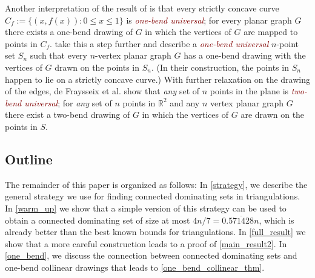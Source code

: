 \documentclass{article}
\newcommand{\R}{\mathbb{R}}
\newcommand{\defin}[1]{\emph{\textcolor{Maroon}{#1}}}
\theoremstyle{definition}
\begin{document}
Another interpretation of the result of \citet{DBLP:journals/comgeo/GiacomoDLW05} is that every strictly concave curve $C_f:=\{(x,f(x)):0\le x\le 1\}$ is \defin{one-bend universal}; for every planar graph $G$ there exists a one-bend drawing of $G$ in which the vertices of $G$ are mapped to points in $C_f$. \citet{DBLP:conf/gd/EverettLLW07} take this a step further and describe a \defin{one-bend universal} $n$-point set $S_n$ such that every $n$-vertex planar graph $G$ has a one-bend drawing with the vertices of $G$ drawn on the points in $S_n$. (In their construction, the points in $S_n$ happen to lie on a strictly concave curve.)
With further relaxation on the drawing of the edges, de Fraysseix et al. \cite{DBLP:journals/combinatorica/FraysseixPP90} show that \emph{any} set of $n$ points in the plane is \defin{two-bend universal}; for \emph{any} set of $n$ points in $\R^2$ and any $n$ vertex planar graph $G$ there exist a two-bend drawing of $G$ in which the vertices of $G$ are drawn on the points in $S$.


\subsection{Outline}

The remainder of this paper is organized as follows:  In \cref{strategy}, we describe the general strategy we use for finding connected dominating sets in triangulations.  In \cref{warm_up} we show that a simple version of this strategy can be used to obtain a connected dominating set of size at most $4n/7= 0.\overline{571428}n$, which is already better than the best known bounds for triangulations.  In \cref{full_result} we show that a more careful construction leads to a proof of \cref{main_result2}.  In \cref{one_bend}, we discuss the connection between connected dominating sets and one-bend collinear drawings that leads to \cref{one_bend_collinear_thm}.



%
\end{document}
